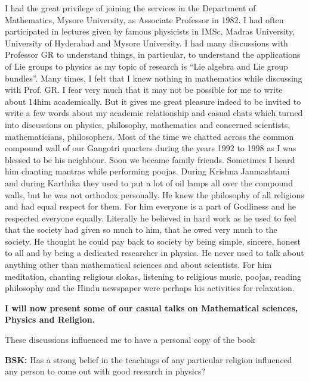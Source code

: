 I had the great privilege of joining the services in the Department of Mathematics, Mysore University, as Associate Professor in 1982. I had often participated in lectures given by famous physicists in IMSc, Madras University, University of Hyderabad and Mysore University. I had many discussions with Professor GR to understand things, in particular, to understand the applications of Lie groups to physics as my topic of research is “Lie algebra and Lie group bundles”. Many times, I felt that I knew nothing in mathematics while discussing with Prof. GR. I fear very much that it may not be possible for me to write about 14him academically. But it gives me great pleasure indeed to be invited to write a few words about my academic relationship and casual chats which turned into discussions on physics, philosophy, mathematics and concerned scientists, mathematicians, philosophers. Most of the time we chatted across the common compound wall of our Gangotri quarters during the years 1992 to 1998 as I was blessed to be his neighbour. Soon we became family friends. Sometimes I heard him chanting mantras while performing poojas. During Krishna Janmashtami and during Karthika they used to put a lot of oil lamps all over the compound walls, but he was not orthodox personally. He knew the philosophy of all religions and had equal respect for them. For him everyone is a part of Godliness and he respected everyone equally. Literally he believed in hard work as he used to feel that the society had given so much to him, that he owed very much to the society. He thought he could pay back to society by being simple, sincere, honest to all and by being a dedicated researcher in physics. He never used to talk about anything other than mathematical sciences and about scientists. For him meditation, chanting religious slokas, listening to religious music, poojas, reading philosophy and the Hindu newspaper were perhaps his activities for relaxation.

\textbf{I will now present some of our casual talks on Mathematical sciences, Physics and Religion.}

These discussions influenced me to have a personal copy of the book \cite{chap13-key03MJL.}

\textbf{BSK:} Has a strong belief in the teachings of any particular religion influenced any person to come out with good research in physics?

